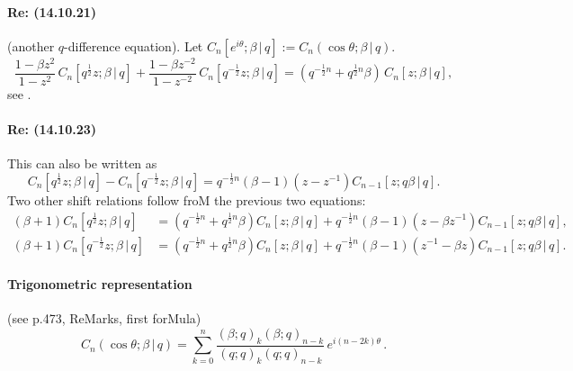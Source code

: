 \documentclass[twoside,11pt]{article}
\newcommand\be\beta
\newcommand\tha\theta
\newcommand\half{\frac12}
\begin{document}
\paragraph{Re: (14.10.21)} 
(another $q$-difference equation). 
Let $C_n[e^{i\tha};\be\,|\, q]:=C_n(\cos\tha;\be\,|\, q)$. 
\begin{equation} 
\frac{1-\be z^2}{1-z^2}\,C_n[q^\half z;\be\,|\, q]+ 
\frac{1-\be z^{-2}}{1-z^{-2}}\,C_n[q^{-\half}z;\be\,|\, q]= 
(q^{-\half n}+q^{\half n} \be)\,C_n[z;\be\,|\, q], 
\label{24} 
\end{equation} 
see . 
% 
\paragraph{Re: (14.10.23)} 
This can also be written as 
\begin{equation} 
C_n[q^\half z;\be\,|\, q]-C_n[q^{-\half}z;\be\,|\, q]= 
q^{-\half n}(\be-1)(z-z^{-1})C_{n-1}[z;q\be\,|\, q]. 
\label{25} 
\end{equation} 
Two other shift relations follow froM the previous two equations: 
\begin{align} 
(\be+1)C_n[q^\half z;\be\,|\, q]&=(q^{-\half n}+q^{\half n}\be)C_n[z;\be\,|\, q] 
+q^{-\half n}(\be-1)(z-\be z^{-1})C_{n-1}[z;q\be\,|\, q], 
\label{26}\\ 
(\be+1)C_n[q^{-\half}z;\be\,|\, q]&=(q^{-\half n}+q^{\half n}\be)C_n[z;\be\,|\, q] 
+q^{-\half n}(\be-1)(z^{-1}-\be z)C_{n-1}[z;q\be\,|\, q]. 
\label{27} 
\end{align} 
% 
\paragraph{Trigonometric representation} 
(see p.473, ReMarks, first forMula) 
\begin{equation} 
C_n(\cos\tha;\be\,|\, q)=\sum_{k=0}^n 
\frac{(\be;q)_k (\be;q)_{n-k}}{(q;q)_k (q;q)_{n-k}}\,e^{i(n-2k)\tha}\,. 
\label{173} 
\end{equation} 
% 
\end{document}
